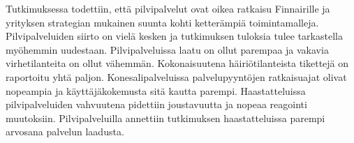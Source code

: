 Tutkimuksessa todettiin, että pilvipalvelut ovat oikea ratkaisu Finnairille ja yrityksen strategian mukainen suunta kohti ketterämpiä toimintamalleja. Pilvipalveluiden siirto on vielä kesken ja tutkimuksen tuloksia tulee tarkastella myöhemmin uudestaan. Pilvipalveluissa laatu on ollut parempaa ja vakavia virhetilanteita on ollut vähemmän. Kokonaisuutena häiriötilanteista tikettejä on raportoitu yhtä paljon. Konesalipalveluissa palvelupyyntöjen ratkaisuajat olivat nopeampia ja käyttäjäkokemusta sitä kautta parempi. Haastatteluissa pilvipalveluiden vahvuutena pidettiin joustavuutta ja nopeaa reagointi muutoksiin. Pilvipalveluilla annettiin tutkimuksen haastatteluissa parempi arvosana palvelun laadusta.  
